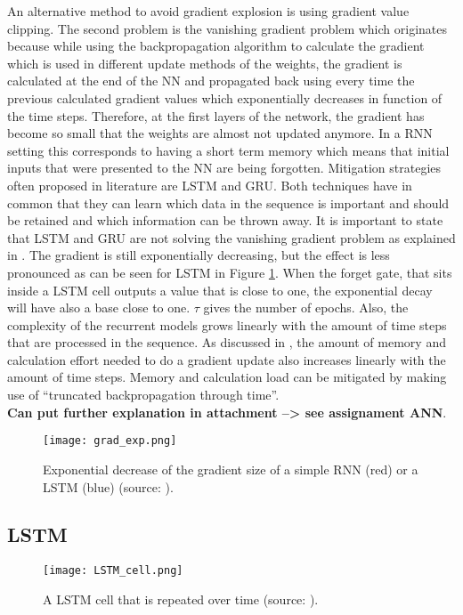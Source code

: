 An alternative method to avoid gradient explosion is using gradient value clipping.
The second problem is the vanishing gradient problem which originates because while using the backpropagation algorithm to calculate the gradient which is used in different update methods of the weights, the gradient is calculated at the end of the NN and propagated back using every time the previous calculated gradient values which exponentially decreases in function of the time steps. Therefore, at the first layers of the network, the gradient has become so small that the weights are almost not updated anymore. In a RNN setting this corresponds to having a short term memory which means that initial inputs that were presented to the NN are being forgotten. Mitigation strategies often proposed in literature are LSTM and GRU. Both techniques have in common that they can learn which data in the sequence is important and should be retained and which information can be thrown away. It is important to state that LSTM and GRU are not solving the vanishing gradient problem as explained in \cite{Teuwen2019}. The gradient is still exponentially decreasing, but the effect is less pronounced as can be seen for LSTM in Figure \ref{fig:grad_exp}. When the forget gate, that sits inside a LSTM cell outputs a value that is close to one, the exponential decay will have also a base close to one. $ \tau $ gives the number of epochs. Also, the complexity of the recurrent models grows linearly with the amount of time steps that are processed in the sequence. As discussed in \cite{Teuwen2019}, the amount of memory and calculation effort needed to do a gradient update also increases linearly with the amount of time steps. Memory and calculation load can be mitigated by making use of ``truncated backpropagation through time''. \\ \textbf{Can put further explanation in attachment --> see assignament ANN}.

\begin{figure}[h!]
	\centering
	\texttt{[image: grad\_exp.png]}
	\caption{Exponential decrease of the gradient size of a simple RNN (red) or a LSTM (blue) (source: \cite{Teuwen2019}).}
	\label{fig:grad_exp}
\end{figure}


\subsection{LSTM}\label{s:LSTM}

\begin{figure}[ht]
	\centering
	\texttt{[image: LSTM\_cell.png]}
	\caption{A LSTM cell that is repeated over time (source: \cite{Olah}).}
	\label{fig:LSTM_cell}
\end{figure}

